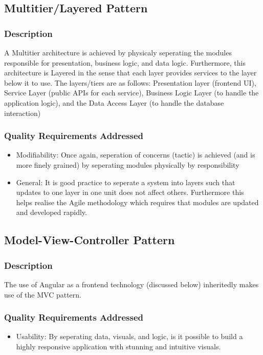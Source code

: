 \documentclass[12pt]{article}
\begin{document}
\subsection{Multitier/Layered Pattern}
\subsubsection{Description}
A Multitier architecture is achieved by physicaly seperating the modules responsible for presentation, business logic, and data logic. Furthermore, this architecture is Layered in the sense that each layer provides services to the layer below it to use. The layers/tiers are as follows: Presentation layer (frontend UI), Service Layer (public APIs for each service), Business Logic Layer (to handle the application logic), and the Data Access Layer (to handle the database interaction)
\subsubsection{Quality Requirements Addressed}
\begin{itemize}
    \item Modifiability: Once again, seperation of concerns (tactic) is achieved (and is more finely grained) by seperating modules physically by responsibility
    \item General: It is good practice to seperate a system into layers such that updates to one layer in one unit does not affect others. Furthermore this helps realise the Agile methodology which requires that modules are updated and developed rapidly.
\end{itemize}
\subsection{Model-View-Controller Pattern}
\subsubsection{Description}
The use of Angular as a frontend technology (discussed below) inheritedly makes use of the MVC pattern.
\subsubsection{Quality Requirements Addressed}
\begin{itemize}
    \item Usability: By seperating data, visuals, and logic, is it possible to build a highly responsive application with stunning and intuitive visuals.
\end{itemize}
\end{document}

